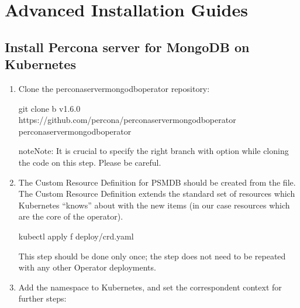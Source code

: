 \documentclass[letterpaper,10pt,english]{sphinxmanual}
\begin{document}
\part{Advanced Installation Guides}
\label{\detokenize{index:advanced-installation-guides}}

\chapter{Install Percona server for MongoDB on Kubernetes}
\label{\detokenize{kubernetes:install-percona-server-for-mongodb-on-kubernetes}}\label{\detokenize{kubernetes::doc}}\begin{enumerate}
%
\setcounter{enumi}{-1}
\item {} 
Clone the percona\sphinxhyphen{}server\sphinxhyphen{}mongodb\sphinxhyphen{}operator repository:

\begin{sphinxVerbatim}[commandchars=\\\{\}]
git clone \PYGZhy{}b v1.6.0 https://github.com/percona/percona\PYGZhy{}server\PYGZhy{}mongodb\PYGZhy{}operator
 percona\PYGZhy{}server\PYGZhy{}mongodb\PYGZhy{}operator
\end{sphinxVerbatim}

\begin{sphinxadmonition}{note}{Note:}
It is crucial to specify the right branch with 
option while cloning the code on this step. Please be careful.
\end{sphinxadmonition}

\item {} 
The Custom Resource Definition for PSMDB should be created from the
 file. The Custom Resource Definition extends the
standard set of resources which Kubernetes “knows” about with the new
items (in our case resources which are the core of the operator).

\begin{sphinxVerbatim}[commandchars=\\\{\}]
\PYGZdl{} kubectl apply \PYGZhy{}f deploy/crd.yaml
\end{sphinxVerbatim}

This step should be done only once; the step does not need to be repeated
with any other Operator deployments.

\item {} 
Add the  namespace to Kubernetes,
and set the correspondent context for further steps:


\end{enumerate}
\end{document}
